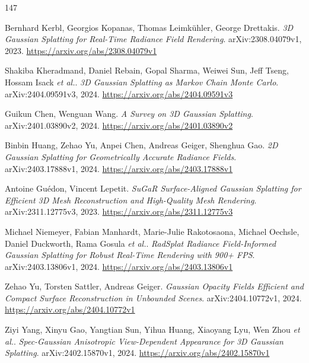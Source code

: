 \documentclass[11pt,a4paper]{article}
\begin{document}
\begin{thebibliography}{147}
\setlength{\itemsep}{2pt}

Bernhard Kerbl, Georgios Kopanas, Thomas Leimk\"{u}hler, George Drettakis.
\newblock \emph{3D Gaussian Splatting for Real-Time Radiance Field Rendering}.
\newblock arXiv:2308.04079v1, 2023.
\newblock \url{https://arxiv.org/abs/2308.04079v1}

Shakiba Kheradmand, Daniel Rebain, Gopal Sharma, Weiwei Sun, Jeff Tseng, Hossam Isack \emph{et al.}.
\newblock \emph{3D Gaussian Splatting as Markov Chain Monte Carlo}.
\newblock arXiv:2404.09591v3, 2024.
\newblock \url{https://arxiv.org/abs/2404.09591v3}

Guikun Chen, Wenguan Wang.
\newblock \emph{A Survey on 3D Gaussian Splatting}.
\newblock arXiv:2401.03890v2, 2024.
\newblock \url{https://arxiv.org/abs/2401.03890v2}

Binbin Huang, Zehao Yu, Anpei Chen, Andreas Geiger, Shenghua Gao.
\newblock \emph{2D Gaussian Splatting for Geometrically Accurate Radiance Fields}.
\newblock arXiv:2403.17888v1, 2024.
\newblock \url{https://arxiv.org/abs/2403.17888v1}

Antoine Gu\'{e}don, Vincent Lepetit.
\newblock \emph{SuGaR Surface-Aligned Gaussian Splatting for Efficient 3D Mesh Reconstruction and High-Quality Mesh Rendering}.
\newblock arXiv:2311.12775v3, 2023.
\newblock \url{https://arxiv.org/abs/2311.12775v3}

Michael Niemeyer, Fabian Manhardt, Marie-Julie Rakotosaona, Michael Oechsle, Daniel Duckworth, Rama Gosula \emph{et al.}.
\newblock \emph{RadSplat Radiance Field-Informed Gaussian Splatting for Robust Real-Time Rendering with 900+ FPS}.
\newblock arXiv:2403.13806v1, 2024.
\newblock \url{https://arxiv.org/abs/2403.13806v1}

Zehao Yu, Torsten Sattler, Andreas Geiger.
\newblock \emph{Gaussian Opacity Fields Efficient and Compact Surface Reconstruction in Unbounded Scenes}.
\newblock arXiv:2404.10772v1, 2024.
\newblock \url{https://arxiv.org/abs/2404.10772v1}

Ziyi Yang, Xinyu Gao, Yangtian Sun, Yihua Huang, Xiaoyang Lyu, Wen Zhou \emph{et al.}.
\newblock \emph{Spec-Gaussian Anisotropic View-Dependent Appearance for 3D Gaussian Splatting}.
\newblock arXiv:2402.15870v1, 2024.
\newblock \url{https://arxiv.org/abs/2402.15870v1}


\end{thebibliography}
\end{document}
